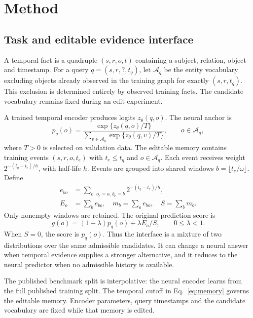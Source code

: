 \section{Method}
\subsection{Task and editable evidence interface}
A temporal fact is a quadruple $(s,r,o,t)$ containing a subject, relation, object and timestamp. For a query $q=(s,r,?,t_q)$, let $\mathcal A_q$ be the entity vocabulary excluding objects already observed in the training graph for exactly $(s,r,t_q)$. This exclusion is determined entirely by observed training facts. The candidate vocabulary remains fixed during an edit experiment.

A trained temporal encoder produces logits $z_\theta(q,o)$. The neural anchor is
\begin{equation}
p_q(o)=\frac{\exp\{z_\theta(q,o)/T\}}{\sum_{v\in\mathcal A_q}\exp\{z_\theta(q,v)/T\}},\qquad o\in\mathcal A_q,
\label{eq:anchor}
\end{equation}
where $T>0$ is selected on validation data. The editable memory contains training events $(s,r,o,t_e)$ with $t_e\le t_q$ and $o\in\mathcal A_q$. Each event receives weight $2^{-(t_q-t_e)/h}$, with half-life $h$. Events are grouped into shared windows $b=\lfloor t_e/\omega\rfloor$. Define
\begin{equation}
\begin{aligned}
e_{bo}&=\sum_{e:\,o_e=o,\,b_e=b}2^{-(t_q-t_e)/h},\\
E_o&=\sum_b e_{bo},\quad m_b=\sum_o e_{bo},\quad S=\sum_b m_b.
\end{aligned}
\label{eq:memory}
\end{equation}
Only nonempty windows are retained. The original prediction score is
\begin{equation}
g(o)=(1-\lambda)p_q(o)+\lambda E_o/S,\qquad 0\le\lambda<1.
\label{eq:fusion}
\end{equation}
When $S=0$, the score is $p_q(o)$. Thus the interface is a mixture of two distributions over the same admissible candidates. It can change a neural answer when temporal evidence supplies a stronger alternative, and it reduces to the neural predictor when no admissible history is available.

The published benchmark split is interpolative: the neural encoder learns from the full published training split. The temporal cutoff in Eq.~\eqref{eq:memory} governs the editable memory. Encoder parameters, query timestamps and the candidate vocabulary are fixed while that memory is edited.

